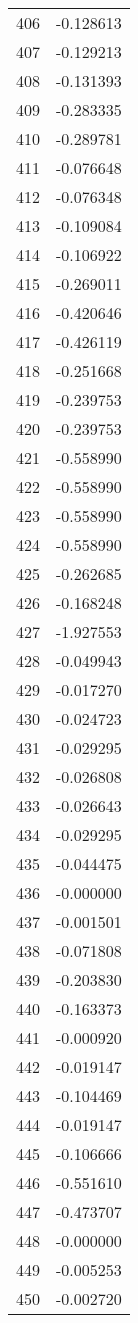 \documentclass[12pt]{article}
\begin{document}
\begin{longtable}{@{}cc@{}}
406 & -0.128613 \\
407 & -0.129213 \\
408 & -0.131393 \\
409 & -0.283335 \\
410 & -0.289781 \\
411 & -0.076648 \\
412 & -0.076348 \\
413 & -0.109084 \\
414 & -0.106922 \\
415 & -0.269011 \\
416 & -0.420646 \\
417 & -0.426119 \\
418 & -0.251668 \\
419 & -0.239753 \\
420 & -0.239753 \\
421 & -0.558990 \\
422 & -0.558990 \\
423 & -0.558990 \\
424 & -0.558990 \\
425 & -0.262685 \\
426 & -0.168248 \\
427 & -1.927553 \\
428 & -0.049943 \\
429 & -0.017270 \\
430 & -0.024723 \\
431 & -0.029295 \\
432 & -0.026808 \\
433 & -0.026643 \\
434 & -0.029295 \\
435 & -0.044475 \\
436 & -0.000000 \\
437 & -0.001501 \\
438 & -0.071808 \\
439 & -0.203830 \\
440 & -0.163373 \\
441 & -0.000920 \\
442 & -0.019147 \\
443 & -0.104469 \\
444 & -0.019147 \\
445 & -0.106666 \\
446 & -0.551610 \\
447 & -0.473707 \\
448 & -0.000000 \\
449 & -0.005253 \\
450 & -0.002720 \\

\end{longtable}
\end{document}
